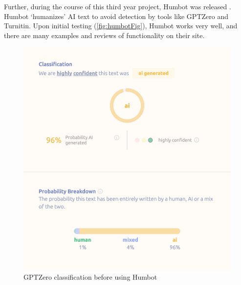 \documentclass[12pt,a4paper]{article}
\begin{document}
Further, during the course of this third year project, Humbot was released \cite{humbot}. Humbot `humanizes' AI text to avoid detection by tools like GPTZero and Turnitin. Upon initial testing (\ref{fig:humbotFig}), Humbot works very well, and there are many examples and reviews of functionality on their site.  
\begin{figure}[H]
    \centering
    \begin{minipage}{0.45\textwidth}
        \centering
        \includegraphics[width=\textwidth]{humbot2.png}
        \caption{GPTZero classification before using Humbot}
    \end{minipage}\hfill
    \begin{minipage}{0.45\textwidth}
        \centering

\end{minipage}
\end{figure}
\end{document}
